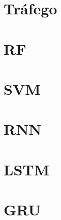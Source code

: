 
\section{Tráfego}



\section{RF}

\section{SVM}



\section {RNN}






\section{LSTM}


\section{GRU}

